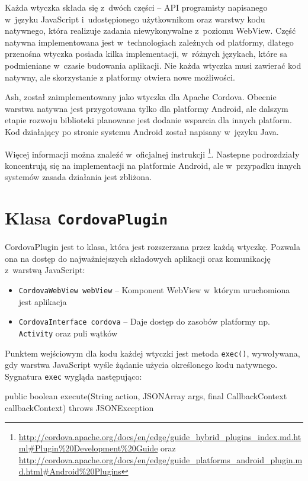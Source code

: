 \documentclass[brudnopis]{xmgr}
\begin{document}
Każda wtyczka składa się z~dwóch części -- API programisty napisanego w~języku JavaScript i~udostępionego użytkownikom oraz warstwy kodu natywnego, która realizuje zadania niewykonywalne z~poziomu WebView. Część natywna implementowana jest w~technologiach zależnych od platformy, dlatego przenośna wtyczka posiada kilka implementacji, w~różnych językach, które sa podmieniane w~czasie budowania aplikacji. Nie każda wtyczka musi zawierać kod natywny, ale skorzystanie z platformy otwiera nowe możliwości.

Ash, został zaimplementowany jako wtyczka dla Apache Cordova. Obecnie warstwa natywna jest przygotowana tylko dla platformy Android, ale dalszym etapie rozwoju biblioteki planowane jest dodanie wsparcia dla innych platform. Kod działający po stronie systemu Android został napisany w~języku Java.

Więcej informacji można znaleźć w~oficjalnej instrukcji
\footnote{
  \url{http://cordova.apache.org/docs/en/edge/guide\_hybrid\_plugins\_index.md.html\#Plugin\%20Development\%20Guide}  
  oraz 
  \url{http://cordova.apache.org/docs/en/edge/guide\_platforms\_android\_plugin.md.html\#Android\%20Plugins}   
}.
Nastepne podrozdziały koncentrują się na implementacji na platformie Android, ale w~przypadku innych systemów zasada działania jest zbliżona.

\section{Klasa \texttt{CordovaPlugin} }

CordovaPlugin jest to klasa, która jest rozszerzana przez każdą wtyczkę. Pozwala ona na dostęp do najważniejszych składowych aplikacji oraz komunikację z~warstwą JavaScript: 

\begin{itemize}
  \item \texttt{CordovaWebView webView} -- Komponent WebView w~którym uruchomiona jest aplikacja
  \item \texttt{CordovaInterface cordova} -- Daje dostęp do zasobów platformy np. \texttt{Activity} oraz puli wątków
\end{itemize}

Punktem wejściowym dla kodu każdej wtyczki jest metoda \texttt{exec()}, wywoływana, gdy warstwa JavaScript wyśle żądanie użycia określonego kodu natywnego. Sygnatura \texttt{exec} wygląda następująco:

\begin{javacode}
public boolean execute(String action, 
                       JSONArray args, 
                       final CallbackContext callbackContext) 
                       throws JSONException
\end{javacode}
\end{document}
